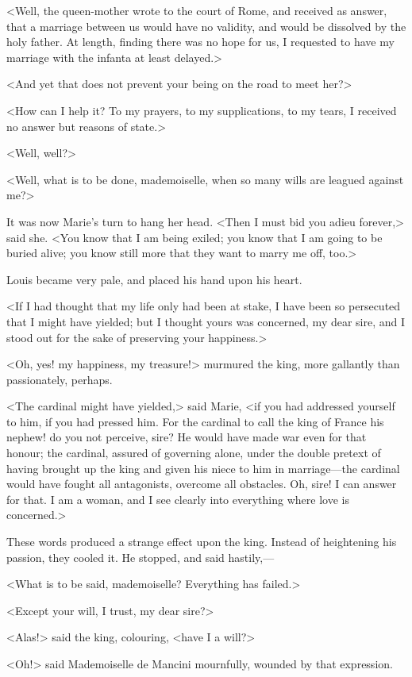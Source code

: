 <Well, the queen-mother wrote to the court of Rome, and received as answer, that a marriage between us would have no validity, and would be dissolved by the holy father. At length, finding there was no hope for us, I requested to have my marriage with the infanta at least delayed.>

<And yet that does not prevent your being on the road to meet her?>

<How can I help it? To my prayers, to my supplications, to my tears, I received no answer but reasons of state.>

<Well, well?>

<Well, what is to be done, mademoiselle, when so many wills are leagued against me?>

It was now Marie's turn to hang her head. <Then I must bid you adieu forever,> said she. <You know that I am being exiled; you know that I am going to be buried alive; you know still more that they want to marry me off, too.>

Louis became very pale, and placed his hand upon his heart.

<If I had thought that my life only had been at stake, I have been so persecuted that I might have yielded; but I thought yours was concerned, my dear sire, and I stood out for the sake of preserving your happiness.>

<Oh, yes! my happiness, my treasure!> murmured the king, more gallantly than passionately, perhaps.

<The cardinal might have yielded,> said Marie, <if you had addressed yourself to him, if you had pressed him. For the cardinal to call the king of France his nephew! do you not perceive, sire? He would have made war even for that honour; the cardinal, assured of governing alone, under the double pretext of having brought up the king and given his niece to him in marriage—the cardinal would have fought all antagonists, overcome all obstacles. Oh, sire! I can answer for that. I am a woman, and I see clearly into everything where love is concerned.>

These words produced a strange effect upon the king. Instead of heightening his passion, they cooled it. He stopped, and said hastily,—

<What is to be said, mademoiselle? Everything has failed.>

<Except your will, I trust, my dear sire?>

<Alas!> said the king, colouring, <have I a will?>

<Oh!> said Mademoiselle de Mancini mournfully, wounded by that expression.

